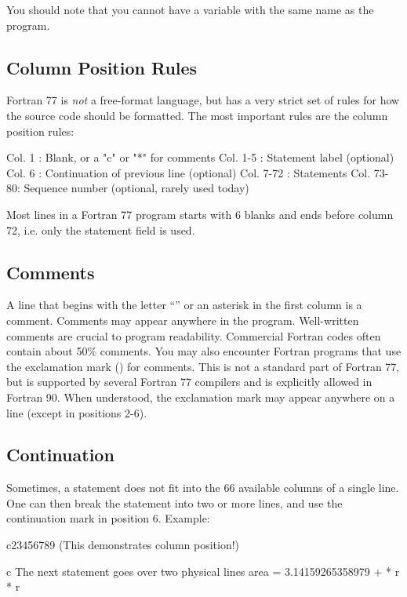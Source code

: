 You should note that you cannot have a variable with the same name as
the program.


\subsection*{Column Position Rules}

Fortran 77 is \textit{not} a free-format language, but has a very strict
set of rules for how the source code should be formatted. The most
important rules are the column position rules:

\begin{xminicode}
Col. 1    : Blank, or a "c" or "*" for comments
Col. 1-5  : Statement label (optional)
Col. 6    : Continuation of previous line (optional)
Col. 7-72 : Statements
Col. 73-80: Sequence number (optional, rarely used today)
\end{xminicode}

Most lines in a Fortran 77 program starts with 6 blanks and ends before
column 72, i.e. only the statement field is used.


\subsection*{Comments}

A line that begins with the letter ``'' or an
asterisk in the first column is a comment. Comments may appear anywhere
in the program. Well-written comments are crucial to program
readability. Commercial Fortran codes often contain about 50\% comments.
You may also encounter Fortran programs that use the exclamation mark
(\inlinefortranss{!}) for comments. This is not a standard part of
Fortran 77, but is supported by several Fortran 77 compilers and is
explicitly allowed in Fortran 90. When understood, the exclamation mark
may appear anywhere on a line (except in positions 2-6).


\subsection*{Continuation}

Sometimes, a statement does not fit into the 66 available columns of a
single line. One can then break the statement into two or more lines,
and use the continuation mark in position 6. Example:

\begin{fortran77}
c23456789 (This demonstrates column position!)

c The next statement goes over two physical lines
      area = 3.14159265358979
     +       * r * r
\end{fortran77}

